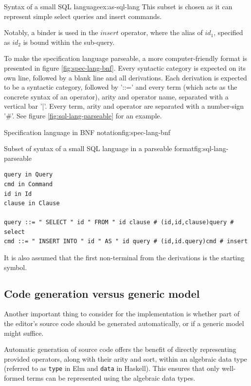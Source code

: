 \begin{example}{Syntax of a small SQL language}{ex:as-sql-lang}
  This subset is chosen as it can represent simple select queries and insert commands.

  Notably, a binder is used in the $insert$ operator, where the alias of $id_1$, specified as $id_2$ is bound within the sub-query.
\end{example}

To make the specification language parseable, a more computer-friendly format is presented in figure \cref{fig:spec-lang-bnf}. Every syntactic category is expected on its own line, followed by a blank line and all derivations. Each derivation is expected to be a syntactic category, followed by '::=' and every term (which acts as the concrete syntax of an operator), arity and operator name, separated with a vertical bar '|'. Every term, arity and operator are separated with a number-sign '\#'. See figure \cref{fig:sql-lang-parseable} for an example.

\begin{myfigure}{Specification language in BNF notation}{fig:spec-lang-bnf}

\end{myfigure}

\begin{myfigure}{Subset of syntax of a small SQL language in a parseable format}{fig:sql-lang-parseable}
\begin{lstlisting}[backgroundcolor=\color{myfigurecolorback}]
query in Query
cmd in Command
id in Id
clause in Clause

query ::= " SELECT " id " FROM " id clause # (id,id,clause)query # select
cmd ::= " INSERT INTO " id " AS " id query # (id,id.query)cmd # insert
\end{lstlisting}

  It is also assumed that the first non-terminal from the derivations is the starting symbol.

\end{myfigure}

\subsection{Code generation versus generic model}

Another important thing to consider for the implementation is whether
part of the editor's source code should be generated automatically,
or if a generic model might suffice.

Automatic generation of source code offers the benefit of directly representing
provided operators, along with their arity and sort, within an algebraic data
type (referred to as \texttt{type} in Elm and \texttt{data} in Haskell).
This ensures that only well-formed terms can be represented using the algebraic
data types.

